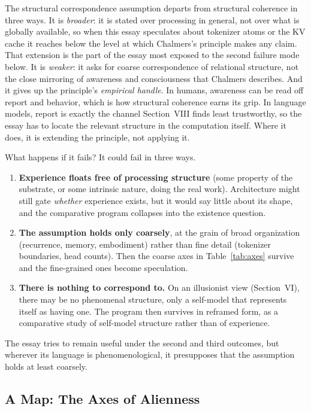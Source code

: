 \documentclass[11pt,letterpaper]{article}
\begin{document}
The structural correspondence assumption departs from structural coherence in three ways. It is \emph{broader}: it is stated over processing in general, not over what is globally available, so when this essay speculates about tokenizer atoms or the KV cache it reaches below the level at which Chalmers's principle makes any claim. That extension is the part of the essay most exposed to the second failure mode below. It is \emph{weaker}: it asks for coarse correspondence of relational structure, not the close mirroring of awareness and consciousness that Chalmers describes. And it gives up the principle's \emph{empirical handle}. In humans, awareness can be read off report and behavior, which is how structural coherence earns its grip. In language models, report is exactly the channel Section~VIII finds least trustworthy, so the essay has to locate the relevant structure in the computation itself. Where it does, it is extending the principle, not applying it.

What happens if it fails? It could fail in three ways.
\begin{enumerate}[label=\textbf{\arabic*.}, leftmargin=1.8em, itemsep=0.4em]
  \item \textbf{Experience floats free of processing structure} (some property of the substrate, or some intrinsic nature, doing the real work). Architecture might still gate \emph{whether} experience exists, but it would say little about its shape, and the comparative program collapses into the existence question.
  \item \textbf{The assumption holds only coarsely}, at the grain of broad organization (recurrence, memory, embodiment) rather than fine detail (tokenizer boundaries, head counts). Then the coarse axes in Table~\ref{tab:axes} survive and the fine-grained ones become speculation.
  \item \textbf{There is nothing to correspond to.} On an illusionist view (Section~VI), there may be no phenomenal structure, only a self-model that represents itself as having one. The program then survives in reframed form, as a comparative study of self-model structure rather than of experience.
\end{enumerate}
The essay tries to remain useful under the second and third outcomes, but wherever its language is phenomenological, it presupposes that the assumption holds at least coarsely.

\subsection{A Map: The Axes of Alienness}
\end{document}
